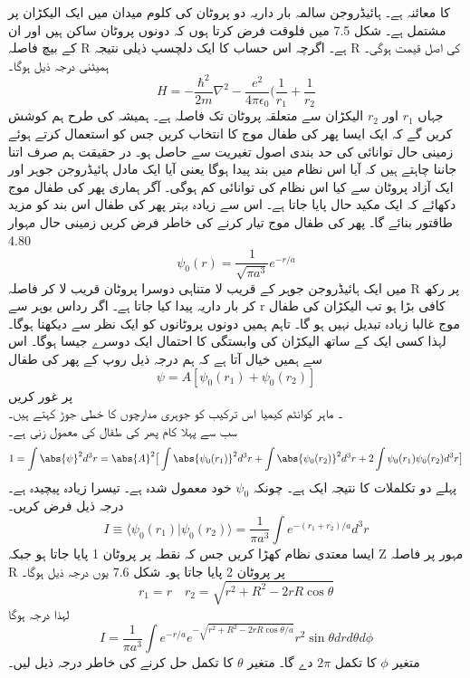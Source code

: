  کا معائنہ ہے۔ ہائیڈروجن سالمہ بار داریہ دو پروٹان کی کلوم میدان میں ایک الیکڑان پر مشتمل ہے۔  شکل 7.5 
میں فلوقت فرض کرتا ہوں کہ دونوں پروٹان ساکن ہیں اور ان کے بیچ فاصلہ R  ہے۔ اگرچہ اس حساب کا ایک دلچسپ ذیلی نتیجہ R کی اصل قیمت ہوگی۔  ہمیٹنی درجہ ذیل ہوگا۔
 \[H=-\frac{\hbar^{2}}{2m}\nabla^{2}-\frac{e^{2}}{4\pi\epsilon_{0}}(\frac{1}{r_{1}}+\frac{1}{r_{2}}\]
جہاں
\( r_{1}\)  
اور 
\(r_{2}\) 
الیکڑان سے متعلقہ پروٹان تک فاصلہ ہے۔ ہمیشہ کی طرح ہم کوشش کریں گے کہ ایک ایسا پھر کی طفال موج کا انتخاب کریں جس کو استعمال کرتے ہوئے زمینی حال توانائی کی حد بندی اصول تغیریت سے حاصل ہو۔ در حقیقت ہم صرف اتنا جاننا چاہتے ہیں کہ آیا اس نظام میں  بند پیدا ہوگا یعنی آیا ایک مادل ہائیڈروجن جوہر اور ایک آزاد پروٹان سے کیا اس نظام کی توانائی کم ہوگی۔ آگر ہماری پھر کی طفال موج دکھائے کہ ایک مکید حال پایا جاتا ہے۔ اس سے زیادہ بہتر پھر کی طفال اس بند کو مزید طاقتور بنائے گا۔ پھر کی طفال موج تیار کرنے کی خاطر فرض کریں زمینی حال مہوار 4.80
\[\psi_{0}(r)=\frac{1}{\sqrt{\pi a^{3}}}e^{-r/a}\]
 میں ایک ہائیڈروجن جوہر کے قریب لا متناہی دوسرا پروٹان قریب لا کر فاصلہ  R پر رکھ کر بار داریہ پیدا کیا جاتا ہے۔ اگر رداس بوہر سے r کافی بڑا ہو تب الیکڑان کی طفال موج غالبا زیادہ تبدیل نہیں ہو گا۔ تاہم ہمیں دونوں پروٹانوں کو ایک نظر سے دیکھنا ہوگا۔ لہذا کسی ایک کے ساتھ الیکڑان کی وابستگی کا احتمال ایک دوسرے جیسا ہوگا۔ اس سے ہمیں خیال آتا ہے کہ ہم درجہ ذیل روپ کے پھر کی طفال 
  \[\psi=A[\psi_{0}(r_{1})+\psi_{0}(r_{2})]\]
 پر غور کریں\\
۔ ماہر کوانٹم کیمیا اس ترکیب کو جوہری مدارچوں کا خطی جوڑ کہتے ہیں۔ \\
سب سے پہلا کام پھر کی طفال کی معمول زنی ہے۔
 \[1=\int\abs{\psi}^{2}d^{3}r=\abs{A}^{2}\big [\int \abs{\psi_{0}(r_{1})}^{2}d^{3}r+\int \abs{\psi_{0}(r_{2})}^{2}d^{3}r+2\int\psi_{0}(r_{1})\psi_{0}(r_{2})d^{3}r\big ]\]
پہلے دو تکلملات کا نتیجہ ایک ہے۔ چونکہ  
\(\psi_{0}\)
خود معمول شدہ ہے۔ تیسرا زیادہ پیچیدہ ہے۔ درجہ ذیل فرض کریں۔\\
 \[I\equiv\langle \psi_{0}(r_{1})|\psi_{0}(r_{2})\rangle=\frac{1}{\pi a^{3}}\int e^{-(r_{1}+r_{2})/a}d^{3}r\]
ایسا معتدی نظام کھڑا کریں جس کہ نقطہ پر پروٹان 1 پایا جاتا ہو جبکہ Z مہور پر فاصلہ R پر پروٹان 2 پایا جاتا ہو۔ شکل 7.6 یوں درجہ ذیل ہوگا۔ \\
\[r_{1}=r \quad r_{2}=\sqrt{r^{2}+R^{2}-2rR\cos{\theta}}\]
لہذا درجہ ہوگا \\
\[I=\frac{1}{\pi a^{3}}\int e^{-r/a}e^{-\sqrt{r^{2}+R^{2}-2rR\cos{\theta/a}}}r^{2}\sin{\theta}drd\theta d\phi\]
متغیر 
\(\phi\)
 کا تکمل 
 \(2\pi\)
  دے گا۔ متغیر 
  \(\theta\)
   کا تکمل حل کرنے کی خاطر درجہ ذیل لیں۔\\

